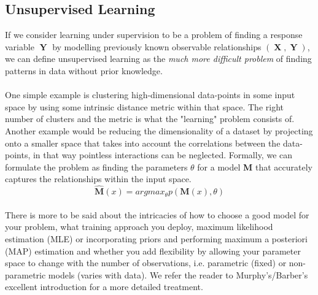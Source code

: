 \documentclass[a4paper]{article}
\DeclareMathOperator{\boldX}{\textbf{X}}
\DeclareMathOperator{\boldY}{\textbf{Y}}
\begin{document}
\subsection{Unsupervised Learning}
If we consider learning under supervision to be a problem of finding a response variable $\boldY$ by modelling previously known observable relationships $(\boldX,\boldY)$, we can define unsupervised learning as the \textit{much more difficult problem} of finding patterns in data without prior knowledge. \\
\\
One simple example is clustering high-dimensional data-points in some input space by using some intrinsic distance metric within that space. The right number of clusters and the metric is what the "learning" problem consists of. 
Another example would be reducing the dimensionality of a dataset by projecting onto a smaller space that takes into account the correlations between the data-points, in that way pointless interactions can be neglected.
Formally, we can formulate the problem as finding the parameters $\theta$ for a model \textbf{M} that accurately captures the relationships within the input space.  
\begin{equation}\label{unsupervised_master_equation}
\hat{\textbf{M}}(x) = argmax_{\theta} p(\textbf{M}(x),\theta)
\end{equation}
\\
There is more to be said about the intricacies of how to choose a good model for your problem, what training approach you deploy, maximum likelihood estimation (MLE) or incorporating priors and performing maximum a posteriori (MAP) estimation and whether you add flexibility by allowing your parameter space to change with the number of observations, i.e. parametric (fixed) or non-parametric models (varies with data). We refer the reader to Murphy's/Barber's excellent introduction \cite{murphy2012} for a more detailed treatment.  
\end{document}
